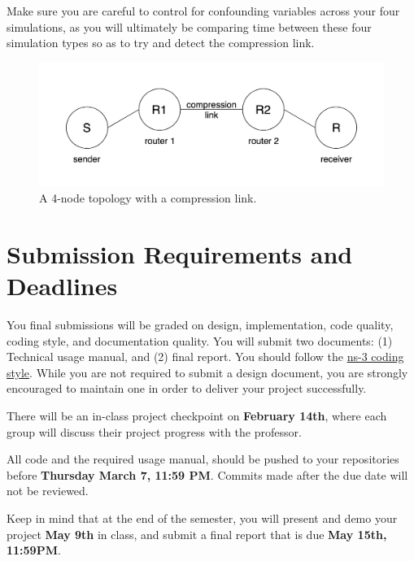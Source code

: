 \documentclass[10pt]{article}
\begin{document}
Make sure you are careful to control for confounding variables across your four simulations, as you will ultimately be comparing time between these four simulation types so as to try and detect the compression link.

\begin{figure}
  \includegraphics[width=\linewidth]{link_diagram.png}
  \caption{A 4-node topology with a compression link.}
  \label{link}
\end{figure}

\section{Submission Requirements and Deadlines}
You final submissions will be graded on design, implementation, code quality, coding style, and documentation quality. You will submit two documents: (1) Technical usage manual, and (2) final report. You should follow the \href{https://www.nsnam.org/develop/contributing-code/coding-style/}{ns-3 coding style}. While you are not required to submit a design document, you are strongly encouraged to maintain one in order to deliver your project successfully.

There will be an in-class project checkpoint on \textbf{February 14th}, where each group will discuss their project progress with the professor.

All code and the required usage manual, should be pushed to your repositories before \textbf{Thursday March 7, 11:59 PM}. Commits made after the due date will not be reviewed.

Keep in mind that at the end of the semester, you will present and demo your project \textbf{May 9th} in class, and submit a final report that is due \textbf{May 15th, 11:59PM}.
\end{document}

